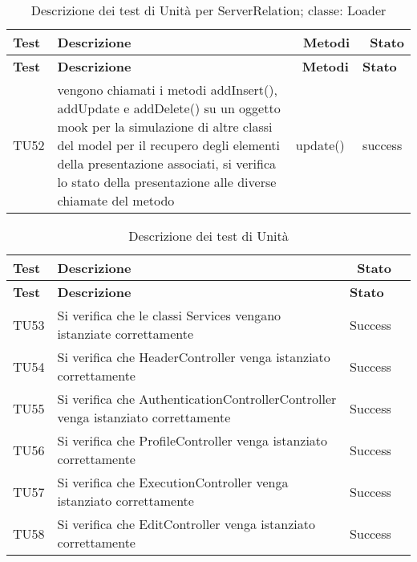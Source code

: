   \begin{longtable} [c]{| p{2cm} | p{6cm} |p{3cm} | p{2cm} |}
		 	 						\caption{Descrizione dei test di Unità per ServerRelation; classe: Loader \label{tab:verTestUnit}}\\
	  		 \hline
	  		 \textbf{Test} & \textbf{Descrizione} & \ \textbf{Metodi} & \ \textbf{Stato} \\
	  		 \hline
	  		 \endfirsthead
	  		 \hline
	  		 \textbf{Test} & \textbf{Descrizione} & \ \textbf{Metodi} & \textbf{Stato} \\
	  		 \hline
		 	 						\endhead
	  		 \hline
	  		 \endfoot
	  		 \hline
	  		 \endlastfoot
 		 TU52 & vengono chiamati i metodi addInsert(), addUpdate e addDelete() su un oggetto mook per la simulazione di altre classi del model per il recupero degli elementi della presentazione associati, si verifica lo stato della presentazione alle diverse chiamate del metodo  & update() & success \\
 		 \end{longtable}
 		 
	 \begin{longtable} [c]{| p{2cm} | p{6cm} |p{3cm} | p{2cm} |}
		 			\caption{Descrizione dei test di Unità \label{tab:verTestUnit}}\\
	 		 \hline
	 		 \textbf{Test} & \textbf{Descrizione} & \ \textbf{Stato} \\
	 		 \hline
	 		 \endfirsthead
	 		 \hline
	 		 \textbf{Test} & \textbf{Descrizione} & \textbf{Stato} \\
	 		 \hline
		 			\endhead
	 		 \hline
	 		 \endfoot
	 		 \hline
	 		 \endlastfoot
          TU53 & Si verifica che le classi Services vengano istanziate correttamente & Success \\
          \hline
          TU54 & Si verifica che HeaderController venga istanziato correttamente & Success \\
          \hline 
          TU55 & Si verifica che AuthenticationControllerController venga istanziato correttamente & Success\\
          \hline
          TU56 & Si verifica che ProfileController venga istanziato correttamente & Success \\
          \hline
          TU57 & Si verifica che ExecutionController venga istanziato correttamente & Success \\
          \hline
          TU58 & Si verifica che EditController venga istanziato correttamente & Success \\
		 		\end{longtable}
 				 